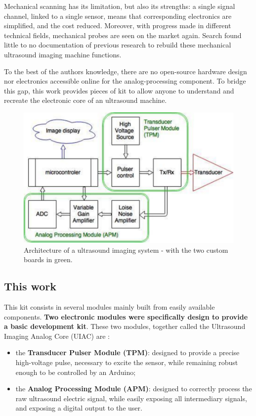 \documentclass[letterpaper, 10 pt, conference]{ieeeconf} %
\begin{document}
Mechanical scanning has its limitation, but also its strengths: a single signal channel, linked to a single sensor, means that corresponding electronics are simplified, and the cost reduced. Moreover, with progress made in different technical fields, mechanical probes are seen on the market again. Search found little to no documentation of previous research to rebuild these mechanical ultrasound imaging machine functions.

To the best of the authors knowledge, there are no open-source hardware design nor electronics accessible online for the analog-processing component. To bridge this gap, this work provides pieces of kit to allow anyone to understand and recreate the electronic core of an ultrasound machine. 

\begin{figure}%
\centering
\includegraphics[width=.8\linewidth]{fullprinciples.pdf}
\caption{Architecture of a ultrasound imaging system - with the two custom boards in green.}
\end{figure}

\subsection{This work}

This kit consists in several modules mainly built from easily available components. \textbf{Two electronic modules were specifically design to provide a basic development kit}. These two modules, together called the Ultrasound Imaging Analog Core (UIAC) are :

\begin{itemize}
\item the \textbf{Transducer Pulser Module (TPM)}: designed to provide a precise high-voltage pulse, necessary to excite the sensor, while remaining robust enough to be controlled by an Arduino;  
\item the \textbf{Analog Processing Module (APM)}: designed to correctly process the raw ultrasound electric signal, while easily exposing all intermediary signals, and exposing a digital output to the user. 
\end{itemize}
\end{document}
